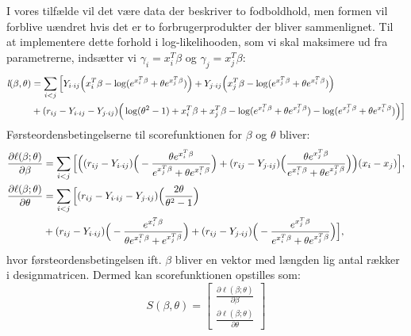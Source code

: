\documentclass[11pt,a4paper]{article}
\begin{document}
I vores tilfælde vil det være data der beskriver to fodboldhold, men formen vil forblive uændret hvis det er to forbrugerprodukter der bliver sammenlignet.
Til at implementere dette forhold i log-likelihooden, som vi skal maksimere ud fra parametrerne, indsætter vi $\gamma_i=x_i^T\beta$ og $\gamma_j=x_j^T\beta$:
\begin{align*}
\textit{l}(\beta,\theta)
&=\sum_{i<j}\Big{[}Y_{i\cdot ij}\Big{(}x_i^T\beta-\log(e^{x_i^T\beta}+\theta e^{x_j^T\beta})\Big{)}
+Y_{j\cdot ij}\Big{(}x_j^T\beta-\log(e^{x_j^T\beta}+\theta e^{x_i^T\beta})\Big{)}\\
& +(r_{ij}-Y_{i\cdot ij}-Y_{j\cdot ij}) \Big{(} \log(\theta^2-1)+x_i^T\beta+x_j^T\beta-\log(e^{x_i^T\beta}+\theta e^{x_j^T\beta})-\log(e^{x_j^T\beta}+\theta e^{x_i^T\beta})\Big{)}\Big{]}
\end{align*}
Førsteordensbetingelserne til scorefunktionen for $\beta$ og $\theta$ bliver:
\begin{align*}
\frac{\partial \ell(\beta;\theta)}{\partial \beta}&= 
\sum_{i<j}\Big{[}\Big{(}
(r_{ij}-Y_{i\cdot ij})\Big{(}-\frac{\theta e^{x_i^T\beta}}{e^{x_j^T\beta}+\theta e^{x_i^T\beta}}\Big{)}+(r_{ij}-Y_{j\cdot ij})\Big{(}\frac{\theta e^{x_j^T\beta}}{e^{x_i^T\beta}+\theta e^{x_j^T\beta}}\Big{)}\Big{)}(x_i-x_j)\Big{]},\\
\frac{\partial \ell(\beta;\theta)}{\partial \theta}&=
\sum_{i<j}
\Big{[}
 (r_{ij}-Y_{i\cdot ij}-Y_{j\cdot ij})\Big{(}\frac{2\theta}{\theta^2-1}\Big{)}\\
 &+(r_{ij}-Y_{i\cdot ij})\Big{(}-\frac{e^{x_i^T\beta}}{\theta e^{x_i^T\beta}+e^{x_j^T\beta}}\Big{)}
 +(r_{ij}-Y_{j\cdot ij})\Big{(}-\frac{e^{x_j^T\beta}}{e^{x_i^T\beta}+\theta e^{x_j^T\beta}}\Big{)}
\Big{]},\\
\end{align*}
hvor førsteordensbetingelsen ift. $\beta$ bliver en vektor med længden lig antal rækker i designmatricen. Dermed kan scorefunktionen opstilles som:
\begin{equation}
S(\beta,\theta) = \begin{bmatrix}
\frac{\partial \ell(\beta;\theta)}{\partial \beta}\\
\frac{\partial \ell(\beta;\theta)}{\partial \theta}
\end{bmatrix}
\label{score}
\end{equation}
\end{document}
